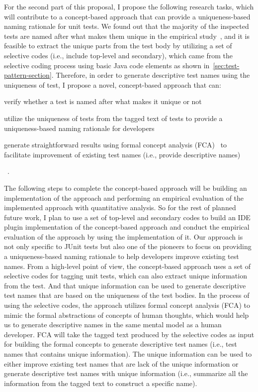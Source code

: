 For the second part of this proposal, I propose the following research tasks, which will contribute to a concept-based approach that can provide a uniqueness-based naming rationale for unit tests.
We found out that the majority of the inspected tests are named after what makes them unique in the empirical study~\cite{emp-study}, and it is feasible to extract the unique parts from the test body by utilizing a set of selective codes (i.e., include top-level and secondary), which came from the selective coding process using basic Java code elements as shown in~\cref{sec:test-pattern-section}.
%
Therefore, in order to generate descriptive test names using the uniqueness of test, I propose a novel, concept-based approach that can:
%
\begin{enumerate*}
\item verify whether a test is named after what makes it unique or not
\item utilize the uniqueness of tests from the tagged text of tests to provide a uniqueness-based naming rationale for developers
\item generate straightforward results using formal concept analysis (FCA)~\cite{ganter2012formal} to facilitate improvement of existing test names (i.e., provide descriptive names)
\end{enumerate*}~\cite{emp-study}.


The following steps to complete the concept-based approach will be building an implementation of the approach and performing an empirical evaluation of the implemented approach with quantitative analysis.
%
So for the rest of planned future work, I plan to use a set of top-level and secondary codes to build an IDE plugin implementation of the concept-based approach and conduct the empirical evaluation of the approach by using the implementation of it.
%
Our approach is not only specific to JUnit tests but also one of the pioneers to focus on providing a uniqueness-based naming rationale to help developers improve existing test names.
%
From a high-level point of view, the concept-based approach uses a set of selective codes for tagging unit tests, which can also extract unique information from the test.
%
And that unique information can be used to generate descriptive test names that are based on the uniqueness of the test bodies.
%
In the process of using the selective codes, the approach utilizes formal concept analysis (FCA) to mimic the formal abstractions of concepts of human thoughts, which would help us to generate descriptive names in the same mental model as a human developer.
%
FCA will take the tagged text produced by the selective codes as input for building the formal concepts to generate descriptive test names (i.e., test names that contains unique information).
%
The unique information can be used to either improve existing test names that are lack of the unique information or generate descriptive test names with unique information (i.e., summarize all the information from the tagged text to construct a specific name).


